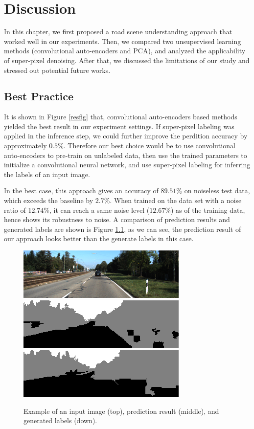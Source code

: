 
\chapter{Discussion}
\label{cha:Discussion}
In this chapter, we first proposed a road scene understanding approach that worked well in our experiments. Then, we compared two unsupervised learning methods (convolutional auto-encoders and PCA), and analyzed the applicability of super-pixel denoising. After that, we discussed the limitations of our study and stressed out potential future works.

\section{Best Practice}
It is shown in Figure \ref{resfig} that, convolutional auto-encoders based methods yielded the best result in our experiment settings. If super-pixel labeling was applied in the inference step, we could further improve the perdition accuracy by approximately $0.5\%$. Therefore our best choice would be to use convolutional auto-encoders to pre-train on unlabeled data, then use the trained parameters to initialize a convolutional neural network, and use super-pixel labeling for inferring the labels of an input image. 

In the best case, this approach gives an accuracy of $89.51\%$ on noiseless test data, which exceeds the baseline by $2.7\%$. When trained on the data set with a noise ratio of $12.74\%$, it can reach a same noise level ($12.67\%$) as of the training data, hence shows its robustness to noise. A comparison of prediction results and generated labels are shown is Figure \ref{noisefig}, as we can see, the prediction result of our approach looks better than the generate labels in this case.

\begin{figure}[h!]
\centering
\includegraphics[width=0.7\linewidth]{pics/img.png}
\includegraphics[width=0.7\linewidth]{pics/super.png}
\includegraphics[width=0.7\linewidth]{pics/noise.png}
\caption{Example of an input image (top), prediction result (middle), and generated labels (down). }
\label{noisefig}
\end{figure}

